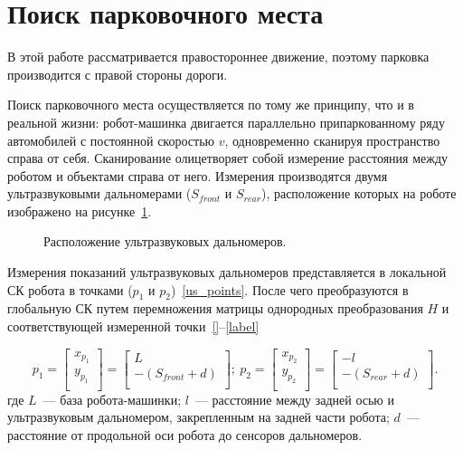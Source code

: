 \newpage
\section{Поиск парковочного места}

В этой работе рассматривается правостороннее движение, поэтому парковка производится с правой стороны дороги. 

Поиск парковочного места осуществляется по тому же принципу, что и в реальной жизни: робот-машинка двигается параллельно припаркованному ряду автомобилей с постоянной скоростью $v$, одновременно сканируя пространство справа от себя. Сканирование олицетворяет собой измерение расстояния между роботом и объектами справа от него.
Измерения производятся двумя ультразвуковыми дальномерами ($S_{front}$ и $S_{rear}$), расположение которых на роботе изображено на рисунке~\ref{robot_and_us_sensors}.

\begin{figure}[h!]
	\begin{minipage}[h]{0.47\textwidth}
	\end{minipage}
	\hfill
	\begin{minipage}[h]{0.47\textwidth}
	\end{minipage}
	\caption{Расположение ультразвуковых дальномеров.}
	\label{robot_and_us_sensors}
\end{figure}

Измерения показаний ультразвуковых дальномеров представляется в локальной СК робота в точками ($p_{1}$ и $p_{2}$)~\eqref{us_points}. После чего преобразуются в глобальную СК путем перемножения матрицы однородных преобразования $H$ и соответствующей измеренной точки~\eqref{}--\eqref{label}

\begin{equation}\label{us_points}
p_{1} = 
\begin{bmatrix}
x_{p_1} \\
y_{p_1} \\
\end{bmatrix}
=
\begin{bmatrix}
L \\
- (S_{front} + d) \\
\end{bmatrix}\!\!;~
p_{2} = 
\begin{bmatrix}
x_{p_2} \\
y_{p_2} \\
\end{bmatrix}
=
\begin{bmatrix}
-l \\
- (S_{rear} + d) \\
\end{bmatrix}\!\!.
\end{equation}
где $L$~--- база робота-машинки; $l$~--- расстояние между задней осью и ультразвуковым дальномером, закрепленным на задней части робота; $d$~--- расстояние от продольной оси робота до сенсоров дальномеров.

